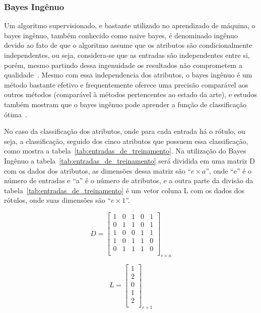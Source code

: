 \subsubsection{Bayes Ingênuo}

Um algoritmo supervisionado, e bastante utilizado no aprendizado de máquina,
o bayes ingênuo, também conhecido como naive bayes, é denominado ingênuo devido
ao fato de que o algoritmo assume que os atributos são condicionalmente
independentes, ou seja, considera-se que as entradas são independentes entre
si, porém, mesmo partindo dessa ingenuidade os resultados não comprometem a
qualidade~\cite{bruno2010aprendizadomaquina}. Mesmo com essa independencia dos
atributos, o bayes ingênuo é um método bastante efetivo e frequentemente oferece
uma precisão comparável aos outros métodos (comparável à métodos pertencentes ao
estado da arte), e estudos também mostram que o bayes ingênuo pode aprender a
função de classificação ótima~\cite{santos2010naivebayes}.

No caso da classificação dos atributos, onde para cada entrada há o rótulo, ou
seja, a classificação, seguido dos cinco atributos que possuem essa classificação,
como mostra a tabela~\ref{tab:entradas_de_treinamento}. Na utilização do Bayes
Ingênuo a tabela~\ref{tab:entradas_de_treinamento} será dividida em uma matriz D
com os dados dos atributos, as dimensões dessa matriz são ``${e \times a}$'', onde
``e'' é o número de entradas e ``a'' é o número de atributos, e a outra parte da
divisão da tabela~\ref{tab:entradas_de_treinamento} é um vetor coluna L com os
dados dos rótulos, onde suas dimensões são ``${e \times 1}$''.

$$D=\left[
\begin{array}{ccccc}
1 & 0 & 1 & 0 & 1 \\
0 & 1 & 1 & 0 & 1 \\
1 & 0 & 0 & 1 & 1 \\
1 & 0 & 1 & 1 & 0 \\
0 & 1 & 1 & 1 & 0 \\
\end{array}
\right]_{e \times a}$$

$$L=\left[
\begin{array}{c}
1 \\
2 \\
0 \\
1 \\
2 \\
\end{array}
\right]_{e \times 1}$$


